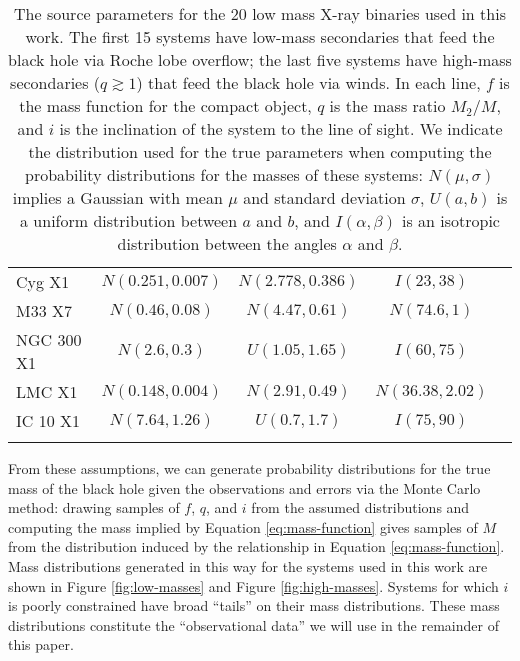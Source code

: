\documentclass[preprint]{aastex}
\begin{document}
\begin{table}
\begin{center}
\begin{tabular}{|l|c|c|c|l|}
      Cyg X1 & $N(0.251, 0.007)$ & $N(2.778, 0.386)$ & $I(23, 38)$ &
      \citet{Gies2003} \\ 
      M33 X7 & $N(0.46, 0.08)$ & $N(4.47, 0.61)$ & $N(74.6, 1)$ &
      \citet{Orosz2007} \\
      NGC 300 X1 & $N(2.6, 0.3)$ & $U(1.05, 1.65)$ & $I(60, 75)$ &
      \citet{Crowther2010} \\
      LMC X1 & $N(0.148, 0.004)$ & $N(2.91, 0.49)$ & $N(36.38, 2.02)$
      & \citet{Orosz2009} \\
      IC 10 X1 & $N(7.64, 1.26)$ & $U(0.7, 1.7)$ & $I(75, 90)$ & 
      \citet{Prestwich2007} \\
       & & & & \citet{Silverman2008} \\
       \hline
    \end{tabular}
  \end{center}
  \caption{\label{tab:sources} The source parameters for the 20 low
    mass X-ray binaries used in this work.  The first 15 systems have
    low-mass secondaries that feed the black hole via Roche lobe
    overflow; the last five systems have high-mass secondaries ($q
    \gtrsim 1$) that feed the black hole via winds.  In each line, $f$
    is the mass function for
    the compact object, $q$ is the mass ratio $M_2/M$, and $i$ is the
    inclination of the system to the line of sight.  We indicate the
    distribution used for the true parameters when computing the
    probability distributions for the masses of these systems:
    $N(\mu,\sigma)$ implies a Gaussian with mean $\mu$ and standard
    deviation $\sigma$, $U(a,b)$ is a uniform distribution between $a$ and
    $b$, and $I(\alpha,\beta)$ is an isotropic distribution between the
    angles $\alpha$ and $\beta$.}
\end{table}

From these assumptions, we can generate probability distributions for
the true mass of the black hole given the observations and errors via
the Monte Carlo method: drawing samples of $f$, $q$, and $i$ from the
assumed distributions and computing the mass implied by Equation
\eqref{eq:mass-function} gives samples of $M$ from the distribution
induced by the relationship in Equation \eqref{eq:mass-function}.
Mass distributions generated in this way for the systems used in this
work are shown in Figure \ref{fig:low-masses} and Figure
\ref{fig:high-masses}.  Systems for which $i$ is poorly constrained
have broad ``tails'' on their mass distributions.  These mass
distributions constitute the ``observational data'' we will use in the
remainder of this paper.
\end{document}
